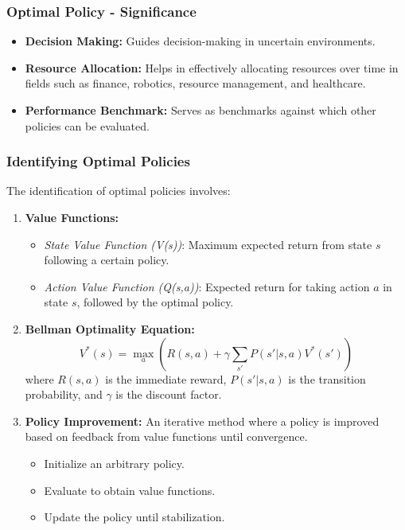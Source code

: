 \documentclass[aspectratio=169]{beamer}
\begin{document}
\begin{frame}[fragile]
    \frametitle{Optimal Policy - Significance}
    \begin{itemize}
        \item \textbf{Decision Making:} Guides decision-making in uncertain environments.
        \item \textbf{Resource Allocation:} Helps in effectively allocating resources over time in fields such as finance, robotics, resource management, and healthcare.
        \item \textbf{Performance Benchmark:} Serves as benchmarks against which other policies can be evaluated.
    \end{itemize}
\end{frame}

\begin{frame}[fragile]
    \frametitle{Identifying Optimal Policies}
    The identification of optimal policies involves:
    
    \begin{enumerate}
        \item \textbf{Value Functions:}
            \begin{itemize}
                \item \textit{State Value Function (V(s))}: Maximum expected return from state $s$ following a certain policy.
                \item \textit{Action Value Function (Q(s,a))}: Expected return for taking action $a$ in state $s$, followed by the optimal policy.
            \end{itemize}

        \item \textbf{Bellman Optimality Equation:} 
            \begin{equation}
                V^*(s) = \max_a \left( R(s, a) + \gamma \sum_{s'} P(s'|s, a)V^*(s') \right)
            \end{equation}
            where $R(s, a)$ is the immediate reward, $P(s'|s, a)$ is the transition probability, and $\gamma$ is the discount factor.

        \item \textbf{Policy Improvement:} 
            An iterative method where a policy is improved based on feedback from value functions until convergence.
            \begin{itemize}
                \item Initialize an arbitrary policy.
                \item Evaluate to obtain value functions.
                \item Update the policy until stabilization.
            \end{itemize}
    \end{enumerate}
\end{frame}
\end{document}
